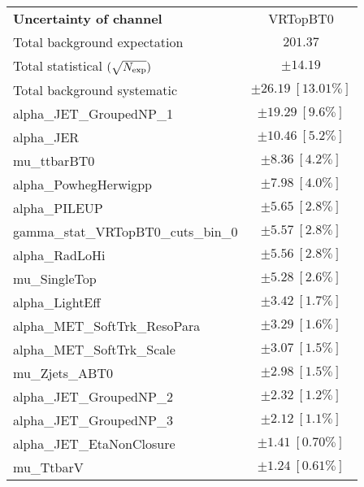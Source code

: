 
\begin{table}
\begin{center}
\setlength{\tabcolsep}{0.0pc}
\begin{tabular*}{\textwidth}{@{\extracolsep{\fill}}lc}
\noalign{\smallskip}\hline\noalign{\smallskip}
{\bf Uncertainty of channel}                                    & VRTopBT0            \\
\noalign{\smallskip}\hline\noalign{\smallskip}
Total background expectation             &  $201.37$       \\
\noalign{\smallskip}\hline\noalign{\smallskip}
Total statistical $(\sqrt{N_{\rm exp}})$              & $\pm 14.19$       \\
Total background systematic               & $\pm 26.19\ [13.01\%] $             \\
\noalign{\smallskip}\hline\noalign{\smallskip}
\noalign{\smallskip}\hline\noalign{\smallskip}
alpha\_JET\_GroupedNP\_1         & $\pm 19.29\ [9.6\%] $       \\
alpha\_JER         & $\pm 10.46\ [5.2\%] $       \\
mu\_ttbarBT0         & $\pm 8.36\ [4.2\%] $       \\
alpha\_PowhegHerwigpp         & $\pm 7.98\ [4.0\%] $       \\
alpha\_PILEUP         & $\pm 5.65\ [2.8\%] $       \\
gamma\_stat\_VRTopBT0\_cuts\_bin\_0         & $\pm 5.57\ [2.8\%] $       \\
alpha\_RadLoHi         & $\pm 5.56\ [2.8\%] $       \\
mu\_SingleTop         & $\pm 5.28\ [2.6\%] $       \\
alpha\_LightEff         & $\pm 3.42\ [1.7\%] $       \\
alpha\_MET\_SoftTrk\_ResoPara         & $\pm 3.29\ [1.6\%] $       \\
alpha\_MET\_SoftTrk\_Scale         & $\pm 3.07\ [1.5\%] $       \\
mu\_Zjets\_ABT0         & $\pm 2.98\ [1.5\%] $       \\
alpha\_JET\_GroupedNP\_2         & $\pm 2.32\ [1.2\%] $       \\
alpha\_JET\_GroupedNP\_3         & $\pm 2.12\ [1.1\%] $       \\
alpha\_JET\_EtaNonClosure         & $\pm 1.41\ [0.70\%] $       \\
mu\_TtbarV         & $\pm 1.24\ [0.61\%] $       \\

\end{tabular*}
\end{center}
\end{table}
